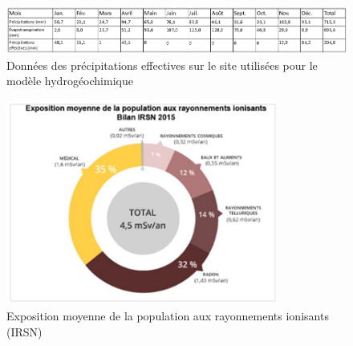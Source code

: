 \documentclass{article}
\begin{document}
\begin{figure}[H]
 \centering
        \includegraphics[width = \textwidth]{III_B_3_5.png} 
        \caption{Données des précipitations effectives sur le site utilisées pour le modèle hydrogéochimique}
        \label{fig:PE_ribiere}
\end{figure}

\begin{figure}[H]
    \centering
    \includegraphics[width=0.8\textwidth]{II_A2_4.png}
    \caption{Exposition moyenne de la population aux rayonnements ionisants (IRSN)}
    \label{fig:exposition_moyenne}
\end{figure}
\end{document}
